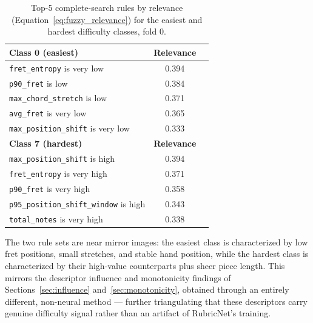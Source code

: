\begin{table}[htbp]
\centering
\caption{Top-5 complete-search rules by relevance (Equation~\ref{eq:fuzzy_relevance}) for the easiest and hardest difficulty classes, fold 0.}
\label{tab:fuzzy_rules}
\begin{tabular}{lcc}
\toprule
\textbf{Class 0 (easiest)} & \textbf{Relevance} & \\
\midrule
\texttt{fret\_entropy} is very low & 0.394 & \\
\texttt{p90\_fret} is low & 0.384 & \\
\texttt{max\_chord\_stretch} is low & 0.371 & \\
\texttt{avg\_fret} is very low & 0.365 & \\
\texttt{max\_position\_shift} is very low & 0.333 & \\
\midrule
\textbf{Class 7 (hardest)} & \textbf{Relevance} & \\
\midrule
\texttt{max\_position\_shift} is high & 0.394 & \\
\texttt{fret\_entropy} is very high & 0.371 & \\
\texttt{p90\_fret} is very high & 0.358 & \\
\texttt{p95\_position\_shift\_window} is high & 0.343 & \\
\texttt{total\_notes} is very high & 0.338 & \\
\bottomrule
\end{tabular}
\end{table}

The two rule sets are near mirror images: the easiest class is characterized by low fret positions, small stretches, and stable hand position, while the hardest class is characterized by their high-value counterparts plus sheer piece length. This mirrors the descriptor influence and monotonicity findings of Sections~\ref{sec:influence} and~\ref{sec:monotonicity}, obtained through an entirely different, non-neural method --- further triangulating that these descriptors carry genuine difficulty signal rather than an artifact of RubricNet's training.

